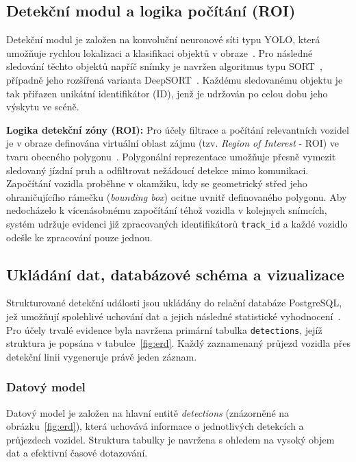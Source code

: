 \documentclass[male,czech,api_bc]{kitheses}
\begin{document}
\subsection{Detekční modul a logika počítání (ROI)}
Detekční modul je založen na konvoluční neuronové síti typu YOLO, která umožňuje rychlou lokalizaci a klasifikaci objektů v obraze~\cite{redmon_yolo_2016}. Pro následné sledování těchto objektů napříč snímky je navržen algoritmus typu SORT~\cite{SORT_original_2016}, případně jeho rozšířená varianta DeepSORT~\cite{wojke_deepsort_2017}. Každému sledovanému objektu je tak přiřazen unikátní identifikátor (ID), jenž je udržován po celou dobu jeho výskytu ve scéně.

\textbf{Logika detekční zóny (ROI):}
Pro účely filtrace a počítání relevantních vozidel je v obraze definována virtuální oblast zájmu (tzv. \textit{Region of Interest} - ROI) ve tvaru obecného polygonu~\cite{mdpi_roi_tracking_2022}. Polygonální reprezentace umožňuje přesně vymezit sledovaný jízdní pruh a odfiltrovat nežádoucí detekce mimo komunikaci. Započítání vozidla proběhne v okamžiku, kdy se geometrický střed jeho ohraničujícího rámečku (\textit{bounding box}) ocitne uvnitř definovaného polygonu. Aby nedocházelo k vícenásobnému započítání téhož vozidla v kolejnych snímcích, systém udržuje evidenci již zpracovaných identifikátorů \texttt{track\_id} a každé vozidlo odešle ke zpracování pouze jednou.


\subsection{Ukládání dat, databázové schéma a vizualizace}

Strukturované detekční události jsou ukládány do relační databáze PostgreSQL, jež umožňují spolehlivé uchování dat a jejich následné statistické vyhodnocení~\cite{psycopg_docs_2025}. Pro účely trvalé evidence byla navržena primární tabulka \texttt{detections}, jejíž struktura je popsána v tabulce~\ref{fig:erd}. Každý zaznamenaný průjezd vozidla přes detekční linii vygeneruje právě jeden záznam.

\subsubsection{Datový model}
Datový model je založen na hlavní entitě \textit{detections} (znázorněné na obrázku~\ref{fig:erd}), která uchovává informace o jednotlivých detekcích a průjezdech vozidel. Struktura tabulky je navržena s ohledem na vysoký objem dat a efektivní časové dotazování.
\end{document}
